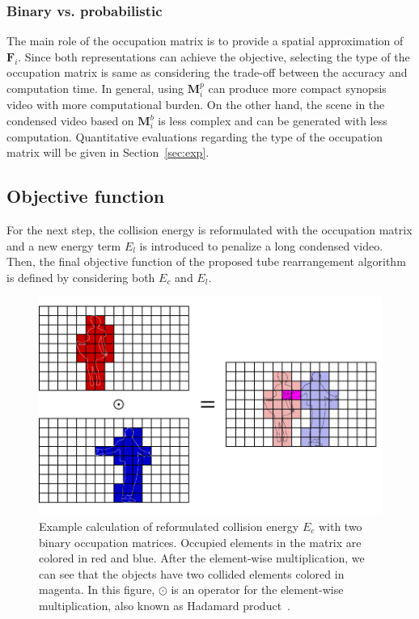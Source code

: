 \documentclass[11pt]{hyu_thesis}
\begin{document}
\subsubsection{Binary vs. probabilistic}
The main role of the occupation matrix is to provide a spatial approximation of $\textbf{F}_i$. Since both representations can achieve the objective, selecting the type of the occupation matrix is same as considering the trade-off between the accuracy and computation time. In general, using $\textbf{M}_i^p$ can produce more compact synopsis video with more computational burden. On the other hand, the scene in the condensed video based on $\textbf{M}_i^b$ is less complex and can be generated with less computation. Quantitative evaluations regarding the type of the occupation matrix will be given in Section~\ref{sec:exp}.

\subsection{Objective function}
For the next step, the collision energy is reformulated with the occupation matrix and a new energy term $E_l$ is introduced to penalize a long condensed video. Then, the final objective function of the proposed tube rearrangement algorithm is defined by considering both $E_c$ and $E_l$. 
\begin{figure}
	\centering
	\includegraphics[width=0.8\linewidth]{hadamard-prod.pdf}
	\caption{Example calculation of reformulated collision energy $E_c$ with two binary occupation matrices. Occupied elements in the matrix are colored in red and blue. After the element-wise multiplication, we can see that the objects have two collided elements colored in magenta. In this figure, $\odot$ is an operator for the element-wise multiplication, also known as Hadamard product~\cite{}.}
	\label{fig:hadamard_prod}
\end{figure}
\end{document}
